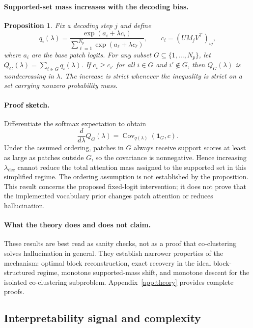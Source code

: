 \documentclass[11pt,a4paper]{article}
\newtheorem{proposition}{Proposition}
\begin{document}
\paragraph{Supported-set mass increases with the decoding bias.}
\begin{proposition}
\label{prop:mass-shift}
Fix a decoding step $j$ and define
\[
q_i(\lambda) = \frac{\exp(a_i + \lambda c_i)}{\sum_{\ell=1}^{N_p}\exp(a_{\ell}+\lambda c_{\ell})},
\qquad
c_i = (UM_jV^\top)_{ij},
\]
where $a_i$ are the base patch logits. For any subset $G \subseteq \{1,\dots,N_p\}$, let $Q_G(\lambda)=\sum_{i\in G} q_i(\lambda)$. If $c_i \ge c_{i'}$ for all $i \in G$ and $i' \notin G$, then $Q_G(\lambda)$ is nondecreasing in $\lambda$. The increase is strict whenever the inequality is strict on a set carrying nonzero probability mass.
\end{proposition}
\paragraph{Proof sketch.}
Differentiate the softmax expectation to obtain
\[
\frac{d}{d\lambda} Q_G(\lambda) = \operatorname{Cov}_{q(\lambda)}(\mathbf{1}_G, c).
\]
Under the assumed ordering, patches in $G$ always receive support scores at least as large as patches outside $G$, so the covariance is nonnegative. Hence increasing $\lambda_{\mathrm{dec}}$ cannot reduce the total attention mass assigned to the supported set in this simplified regime. The ordering assumption is not established by the proposition. This result concerns the proposed fixed-logit intervention; it does not prove that the implemented vocabulary prior changes patch attention or reduces hallucination.

\paragraph{What the theory does and does not claim.} These results are best read as sanity checks, not as a proof that co-clustering solves hallucination in general. They establish narrower properties of the mechanism: optimal block reconstruction, exact recovery in the ideal block-structured regime, monotone supported-mass shift, and monotone descent for the isolated co-clustering subproblem. Appendix~\ref{app:theory} provides complete proofs.

\subsection{Interpretability signal and complexity}
\end{document}

